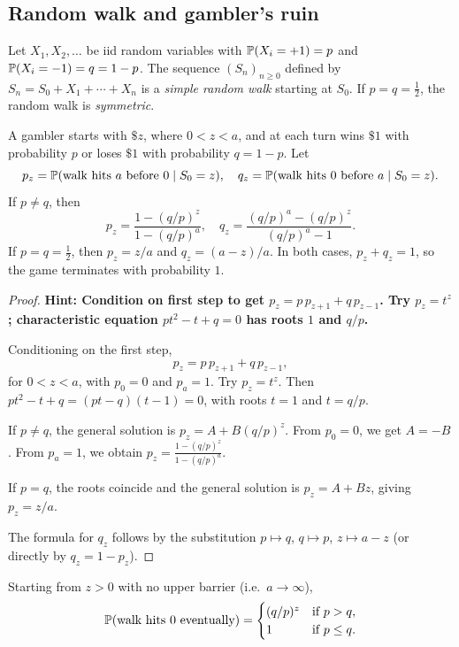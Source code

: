 \documentclass[a4paper]{article}
\begin{document}
\subsection{Random walk and gambler's ruin}
\begin{defi}
  Let $X_1, X_2, \dotsc$ be iid random variables with $\P(X_i = +1) = p$ and $\P(X_i = -1) = q = 1 - p$.
  The sequence $(S_n)_{n \geq 0}$ defined by $S_n = S_0 + X_1 + \cdots + X_n$ is a \emph{simple random walk} starting at $S_0$.
  If $p = q = \frac{1}{2}$, the random walk is \emph{symmetric}.
\end{defi}

\begin{prop}
  A gambler starts with $\$z$, where $0 < z < a$, and at each turn wins $\$1$ with probability $p$ or loses $\$1$ with probability $q = 1 - p$.
  Let
  \[
    p_z = \P(\text{walk hits $a$ before $0$} \mid S_0 = z), \quad
    q_z = \P(\text{walk hits $0$ before $a$} \mid S_0 = z).
  \]
  If $p \neq q$, then
  \[
    p_z = \frac{1 - (q/p)^z}{1 - (q/p)^a}, \quad
    q_z = \frac{(q/p)^a - (q/p)^z}{(q/p)^a - 1}.
  \]
  If $p = q = \frac{1}{2}$, then $p_z = z/a$ and $q_z = (a - z)/a$.
  In both cases, $p_z + q_z = 1$, so the game terminates with probability $1$.
\end{prop}

\begin{proof}
  \textbf{Hint: Condition on first step to get $p_z = p\,p_{z+1} + q\,p_{z-1}$. Try $p_z = t^z$; characteristic equation $pt^2 - t + q = 0$ has roots $1$ and $q/p$.}

  Conditioning on the first step,
  \[
    p_z = p\,p_{z+1} + q\,p_{z-1},
  \]
  for $0 < z < a$, with $p_0 = 0$ and $p_a = 1$.
  Try $p_z = t^z$. Then $pt^2 - t + q = (pt - q)(t - 1) = 0$, with roots $t = 1$ and $t = q/p$.

  If $p \neq q$, the general solution is $p_z = A + B(q/p)^z$.
  From $p_0 = 0$, we get $A = -B$.
  From $p_a = 1$, we obtain $p_z = \frac{1 - (q/p)^z}{1 - (q/p)^a}$.

  If $p = q$, the roots coincide and the general solution is $p_z = A + Bz$, giving $p_z = z/a$.

  The formula for $q_z$ follows by the substitution $p \mapsto q$, $q \mapsto p$, $z \mapsto a - z$ (or directly by $q_z = 1 - p_z$).
\end{proof}

\begin{cor}
  Starting from $z > 0$ with no upper barrier (i.e.\ $a \to \infty$),
  \[
    \P(\text{walk hits $0$ eventually}) = \begin{cases}
      (q/p)^z & \text{if } p > q, \\
      1 & \text{if } p \leq q.
    \end{cases}
  \]
\end{cor}
\end{document}
